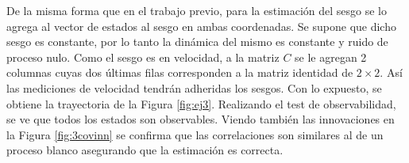 
	De la misma forma que en el trabajo previo, para la estimación del sesgo se lo agrega al vector de estados al sesgo en ambas coordenadas. Se supone que dicho sesgo es constante, por lo tanto la dinámica del mismo es constante y ruido de proceso nulo. Como el sesgo es en velocidad, a la matriz $C$ se le agregan 2 columnas cuyas dos últimas filas corresponden a la matriz identidad de $2\times 2$. Así las mediciones de velocidad tendrán adheridas los sesgos. Con lo expuesto, se obtiene la trayectoria de la Figura \ref{fig:ej3}. Realizando el test de observabilidad, se ve que todos los estados son observables. Viendo también las innovaciones en la Figura \ref{fig:3covinn} se confirma que las correlaciones son similares al de un proceso blanco asegurando que la estimación es correcta.\\ 

